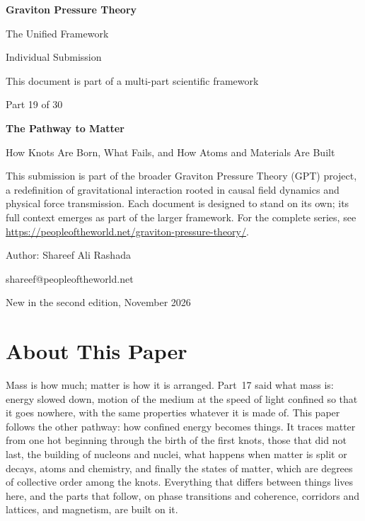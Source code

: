 \documentclass[11pt,a4paper]{article}
\begin{document}
\renewcommand{\thetable}{19.\arabic{table}}
\begin{titlepage}
\centering
\vspace*{1.5cm}
{\Huge\bfseries Graviton Pressure Theory\par}
\vspace{0.4cm}
{\Large The Unified Framework\par}
{\large Individual Submission\par}
\vspace{0.3cm}
{\normalsize This document is part of a multi-part scientific framework\par}
\vspace{1.6cm}
{\large Part 19 of 30\par}
\vspace{0.6cm}
{\huge\bfseries The Pathway to Matter\par}
\vspace{0.5cm}
{\Large How Knots Are Born, What Fails, and How Atoms and Materials Are Built\par}
\vspace{1.4cm}
\begin{minipage}{0.82\textwidth}\centering\small
This submission is part of the broader Graviton Pressure Theory (GPT) project, a redefinition of gravitational interaction rooted in causal field dynamics and physical force transmission. Each document is designed to stand on its own; its full context emerges as part of the larger framework. For the complete series, see \url{https://peopleoftheworld.net/graviton-pressure-theory/}.
\end{minipage}
\vfill
{\large Author: Shareef Ali Rashada\par}
{\normalsize shareef@peopleoftheworld.net\par}
\vspace{0.3cm}
{\normalsize New in the second edition, November 2026\par}
\end{titlepage}

\tableofcontents
\newpage

\section*{About This Paper}

Mass is how much; matter is how it is arranged. Part~17 said what mass is: energy slowed down, motion of the medium at the speed of light confined so that it goes nowhere, with the same properties whatever it is made of. This paper follows the other pathway: how confined energy becomes things. It traces matter from one hot beginning through the birth of the first knots, those that did not last, the building of nucleons and nuclei, what happens when matter is split or decays, atoms and chemistry, and finally the states of matter, which are degrees of collective order among the knots. Everything that differs between things lives here, and the parts that follow, on phase transitions and coherence, corridors and lattices, and magnetism, are built on it.
\end{document}
